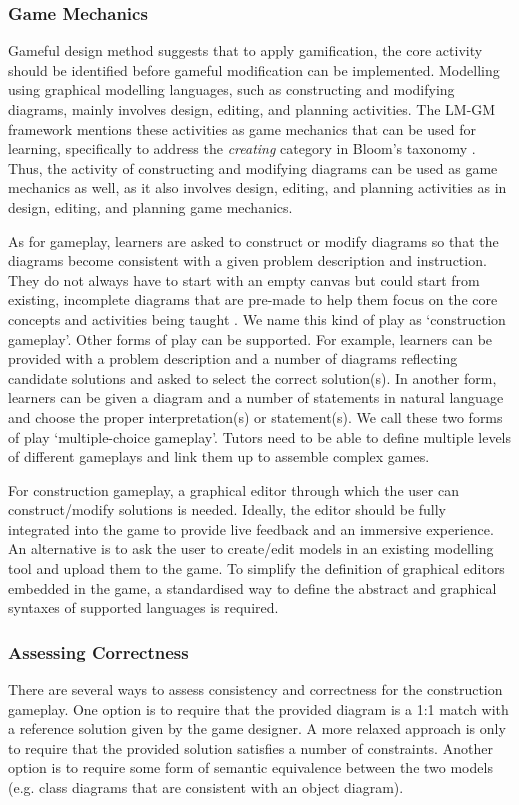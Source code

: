 \documentclass[12pt, a4paper]{report} \usepackage[titletoc]{appendix}
\begin{document}
\subsubsection{Game Mechanics} 
\label{Game Mechanics} 
Gameful design method \cite{deterding2015lens} suggests that to apply gamification, the core activity should be identified before gameful modification can be implemented. Modelling using graphical modelling languages, such as constructing and modifying diagrams, mainly involves design, editing, and planning activities. The LM-GM framework \cite{arnab2015mapping} mentions these activities as game mechanics that can be used for learning, specifically to address the \emph{creating} category in Bloom's taxonomy \cite{krathwohl2002revision}. Thus, the activity of constructing and modifying diagrams can be used as game mechanics as well, as it also involves design, editing, and planning activities as in design, editing, and planning game mechanics.

As for gameplay, learners are asked to construct or modify diagrams so that the diagrams become consistent with a given problem description and instruction. They do not always have to start with an empty canvas but could start from existing, incomplete diagrams that are pre-made to help them focus on the core concepts and activities being taught \cite{deterding2015lens}. We name this kind of play as `construction gameplay'. Other forms of play can be supported. For example, learners can be provided with a problem description and a number of diagrams reflecting candidate solutions and asked to select the correct solution(s). In another form, learners can be given a diagram and a number of statements in natural language and choose the proper interpretation(s) or statement(s). We call these two forms of play `multiple-choice gameplay'. Tutors need to be able to define multiple levels of different gameplays and link them up to assemble complex games. 

For construction gameplay, a graphical editor through which the user can construct/modify solutions is needed. Ideally, the editor should be fully integrated into the game to provide live feedback and an immersive experience. An alternative is to ask the user to create/edit models in an existing modelling tool and upload them to the game. To simplify the definition of graphical editors embedded in the game, a standardised way to define the abstract and graphical syntaxes of supported languages is required. 

\subsubsection{Assessing Correctness} 
\label{Assessing Correctness} 
There are several ways to assess consistency and correctness for the construction gameplay. One option is to require that the provided diagram is a 1:1 match with a reference solution given by the game designer. A more relaxed approach is only to require that the provided solution satisfies a number of constraints. Another option is to require some form of semantic equivalence between the two models (e.g. class diagrams that are consistent with an object diagram). 
\end{document}
